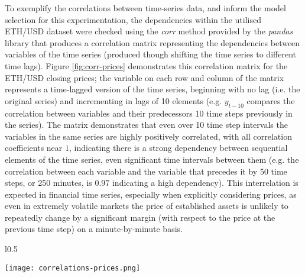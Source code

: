 \documentclass[a4paper, 11pt]{article}
\begin{document}
    To exemplify the correlations between time-series data, and inform the model selection for this experimentation, the dependencies within the utilised ETH/USD dataset were checked using the \emph{corr} method provided by the \emph{pandas} library \cite{pandas} that produces a correlation matrix representing the dependencies between variables of the time series (produced though shifting the time series to different time lags). Figure \ref{fig:corr-prices} demonstrates this correlation matrix for the ETH/USD closing prices; the variable on each row and column of the matrix represents a time-lagged version of the time series, beginning with no lag (i.e. the original series) and incrementing in lags of 10 elements (e.g. $y_{t-10}$ compares the correlation between variables and their predecessors 10 time steps previously in the series). The matrix demonstrates that even over 10 time step intervals the variables in the same series are highly positively correlated, with all correlation coefficients near $1$, indicating there is a strong dependency between sequential elements of the time series, even significant time intervals between them (e.g. the correlation between each variable and the variable that precedes it by 50 time steps, or 250 minutes, is $0.97$ indicating a high dependency). This interrelation is expected in financial time series, especially when explicitly considering prices, as even in extremely volatile markets the price of established assets is unlikely to repeatedly change by a significant margin (with respect to the price at the previous time step) on a minute-by-minute basis.

    \begin{wrapfigure}{l}{0.5\textwidth}
        \caption{test}
        \texttt{[image: correlations-prices.png]}
        \label{fig:corr-prices}
    \end{wrapfigure}
\end{document}
